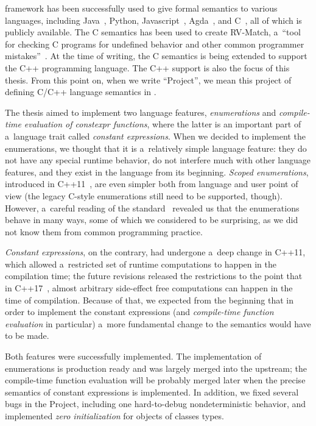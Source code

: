 \documentclass[nolot,nolof,nocover,printed]{fithesis3}
\begin{document}
\K framework has been successfully used to give formal semantics to various languages, including Java~\cite{bogdanas-rosu-2015-popl}, Python, Javascript~\cite{park-stefanescu-rosu-2015-pldi}, Agda~\cite{Tokarcik2015}, and C~\cite{ellison-2012-thesis,hathhorn-ellison-rosu-2015-pldi}, all of which is publicly available. The C semantics has been used to create RV-Match, a~\enquote{tool for checking C programs for undefined behavior and other common programmer mistakes}~\cite{guth-hathhorn-saxena-rosu-2016-cav}.  At the time of writing, the C semantics is being extended to support the C++ programming language. The C++ support is also the focus of this thesis. From this point on, when we write \enquote{Project}, we mean this project of defining C/C++ language semantics in \K.

The thesis aimed to implement two language features, \textit{enumerations} and \textit{compile-time evaluation of constexpr functions}, where the latter is an important part of a~language trait called \textit{constant expressions}. When we decided to implement the enumerations, we thought that it is a~relatively simple language feature: they do not have any special runtime behavior, do not interfere much with other language features, and they exist in the language from its beginning. \textit{Scoped enumerations}, introduced in C++11~\cite{ISOcpp11}, are even simpler both from language and user point of view (the legacy C-style enumerations still need to be supported, though). However, a~careful reading of the standard~\cite{n4296} revealed us that the enumerations behave in many ways, some of which we considered to be surprising, as we did not know them from common programming practice.

\textit{Constant expressions}, on the contrary, had undergone a~deep change in C++11, which allowed a~restricted set of runtime computations to happen in the compilation time; the future revisions released the restrictions to the point that in C++17~\cite{ISOcpp17}, almost arbitrary side-effect free computations can happen in the time of compilation. Because of that, we expected from the beginning that in order to implement the constant expressions (and \textit{compile-time function evaluation} in particular) a~more fundamental change to the semantics would have to be made.

Both features were successfully implemented. The implementation of enumerations is production ready and was largely merged into the upstream; the compile-time function evaluation 
will be probably merged later when the precise semantics of constant expressions is implemented. 
In addition, we fixed several bugs in the Project, including one hard-to-debug nondeterministic behavior, and implemented \textit{zero initialization} for objects of classes types.
\end{document}
